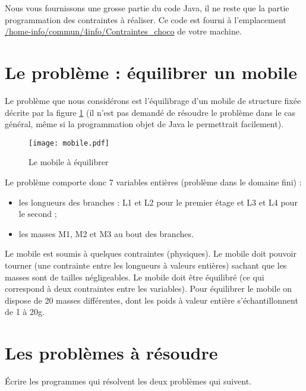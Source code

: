 Nous vous fournissons une grosse partie du code Java, il ne reste que
la partie programmation des contraintes à réaliser. Ce code est fourni
à l'emplacement \url{/home-info/commun/4info/Contraintes_choco} de
votre machine.

\section{Le problème : équilibrer un mobile}

Le problème que nous considérons est l'équilibrage d'un mobile de structure
fixée décrite par la figure \ref{fig:mobile} (il n'est pas demandé de résoudre
le problème dans le cas général, même si la programmation objet de Java le
permettrait facilement).

\begin{figure}
\begin{center}
\texttt{[image: mobile.pdf]}
\caption{Le mobile à équilibrer}
\label{fig:mobile}
\end{center}
\end{figure}

Le problème comporte donc 7 variables entières (problème dans le domaine fini) :

\begin{itemize}

\item les longueurs des branches : L1 et L2 pour le premier étage et L3 et L4
      pour le second ;

\item les masses M1, M2 et M3 au bout des branches.

\end{itemize}

Le mobile est soumis à quelques contraintes (physiques). Le mobile doit pouvoir
tourner (une contrainte entre les longueurs à valeurs entières) sachant que les
masses sont de tailles négligeables. Le mobile doit être équilibré (ce qui
correspond à deux contraintes entre les variables). Pour équilibrer le mobile
on dispose de 20 masses différentes, dont les poids à valeur entière
s'échantillonnent de 1 à 20g.

\section{Les problèmes à résoudre}

\begin{question}
Écrire les programmes qui résolvent les deux problèmes qui suivent.
\end{question}

